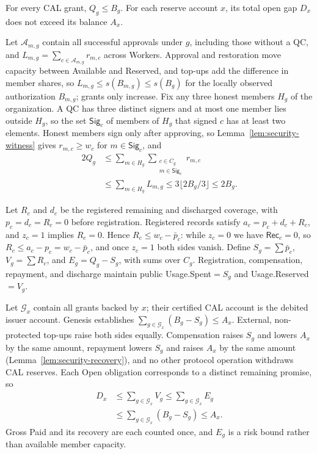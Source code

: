 \begin{theorem}
\label{thm:security-coverage}
For every CAL grant, $Q_g\le B_g$. For each reserve account $x$, its total
open gap $D_x$ does not exceed its balance $A_x$.
\end{theorem}
\begin{IEEEproof}
Let $\mathcal A_{m,g}$ contain all successful approvals under $g$, including those without a QC, and $L_{m,g}=\sum_{c\in\mathcal A_{m,g}}r_{m,c}$ across Workers. Approval and restoration move capacity between Available and Reserved, and top-ups add the difference in member shares, so $L_{m,g}\le s(B_{m,g})\le s(B_g)$ for the locally observed authorization $B_{m,g}$; grants only increase. Fix any three honest members $H_g$ of the organization. A QC has three distinct signers and at most one member lies outside $H_g$, so the set $\mathsf{Sig}_c$ of members of $H_g$ that signed $c$ has at least two elements. Honest members sign only after approving, so Lemma~\ref{lem:security-witness} gives $r_{m,c}\ge w_c$ for $m\in\mathsf{Sig}_c$, and
\begin{equation}
\begin{aligned}
  2Q_g
  &\le\sum_{m\in H_g}\sum_{\substack{c\in C_g\\m\in\mathsf{Sig}_c}}r_{m,c}\\
  &\le\sum_{m\in H_g}L_{m,g}
  \le3\lfloor2B_g/3\rfloor\le2B_g.
\end{aligned}
\label{eq:security-counting}
\end{equation}

Let $R_c$ and $d_c$ be the registered remaining and discharged coverage, with $p_c=d_c=R_c=0$ before registration. Registered records satisfy $a_c=p_c+d_c+R_c$, and $z_c=1$ implies $R_c=0$. Hence $R_c\le w_c-\bar p_c$: while $z_c=0$ we have $\mathsf{Rec}_c=0$, so $R_c\le a_c-p_c=w_c-\bar p_c$, and once $z_c=1$ both sides vanish. Define $S_g=\sum\bar p_c$, $V_g=\sum R_c$, and $E_g=Q_g-S_g$, with sums over $C_g$. Registration, compensation, repayment, and discharge maintain public Usage.Spent$=S_g$ and Usage.Reserved$=V_g$.

Let $\mathcal G_x$ contain all grants backed by $x$; their certified CAL account is the debited issuer account. Genesis establishes $\sum_{g\in\mathcal G_x}(B_g-S_g)\le A_x$. External, non-protected top-ups raise both sides equally. Compensation raises $S_g$ and lowers $A_x$ by the same amount, repayment lowers $S_g$ and raises $A_x$ by the same amount (Lemma~\ref{lem:security-recovery}), and no other protocol operation withdraws CAL reserves. Each Open obligation corresponds to a distinct remaining promise, so
\begin{equation}
\begin{aligned}
D_x&\le\sum_{g\in\mathcal G_x}V_g
    \le\sum_{g\in\mathcal G_x}E_g\\
   &\le\sum_{g\in\mathcal G_x}(B_g-S_g)\le A_x.
\end{aligned}
\label{eq:security-backing}
\end{equation}
Gross Paid and its recovery are each counted once, and $E_g$ is a risk bound rather than available member capacity.
\end{IEEEproof}

